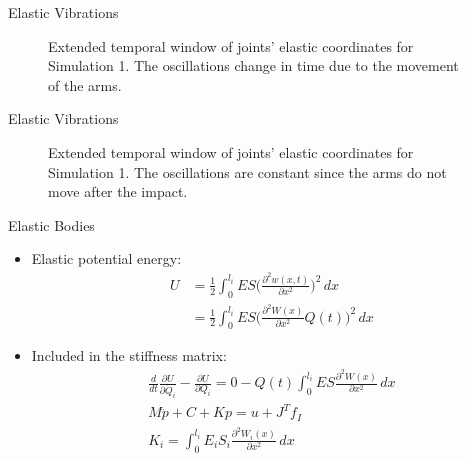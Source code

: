 \begin{frame}{Elastic Vibrations}
  \begin{figure}
    \centering
    \quad
    \caption{Extended temporal window of joints' elastic coordinates for Simulation 1. The oscillations change in time due to the movement of the arms.}
  \end{figure}
\end{frame}

\begin{frame}{Elastic Vibrations}
  \begin{figure}
    \centering
    \quad
    \caption{Extended temporal window of joints' elastic coordinates for Simulation 1. The oscillations are constant since the arms do not move after the impact.}
  \end{figure}
\end{frame}

\begin{frame}{Elastic Bodies}
  \begin{itemize}
    \item Elastic potential energy: 
    \begin{equation}
      \begin{split}
      U&=\frac{1}{2}\int_{0}^{l_i}ES\Big(\frac{\partial^2 w(x,t)}{\partial x^2}\Big)^2\,dx\\
       &=\frac{1}{2}\int_{0}^{l_i}ES\Big(\frac{\partial^2 W(x)}{\partial x^2}Q(t)\Big)^2\,dx
      \end{split}
    \end{equation}
    \item Included in the stiffness matrix:
    \begin{equation}
      \begin{array}{c}
        \frac{d}{dt}\frac{\partial U}{\partial \dot{Q}_i}-\frac{\partial U}{\partial Q_i}=0-Q(t)\int_{0}^{l_i}ES\frac{\partial^2 W(x)}{\partial x^2}\,dx\\
        M\ddot{p}+C+Kp=u+J^Tf_I\\
        K_i=\int_{0}^{l_i}E_iS_i\frac{\partial^2 W_i(x)}{\partial x^2}\,dx
      \end{array}
    \end{equation}
  \end{itemize}
\end{frame}